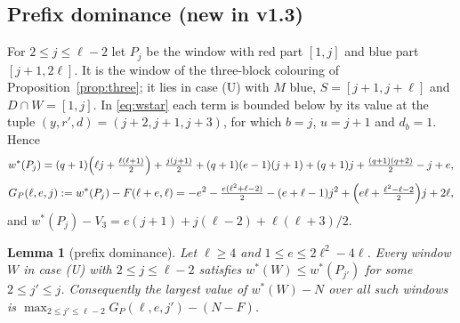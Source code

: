 \documentclass[11pt]{amsart}
\newtheorem{lemma}[theorem]{Lemma}
\theoremstyle{definition}
\newcommand{\F}{F}
\begin{document}
\subsection{Prefix dominance (new in v1.3)}\label{sec:prefix}

For $2\le j\le\ell-2$ let $P_j$ be the window with red part $[1,j]$ and blue part $[j+1,2\ell]$. It is the window of the three-block colouring of Proposition~\ref{prop:three}; it lies in case (U) with $M$ blue, $S=[j+1,j+\ell]$ and $D\cap W=[1,j]$. In \eqref{eq:wstar} each term is bounded below by its value at the tuple $(y,r',d)=(j+2,j+1,j+3)$, for which $b=j$, $u=j+1$ and $d_b=1$. Hence
\begin{equation}\label{eq:P0}
w^*(P_j)=(q+1)\Bigl(\ell j+\tfrac{\ell(\ell+1)}2\Bigr)+\tfrac{j(j+1)}2+(q+1)(e-1)(j+1)+(q+1)j+\tfrac{(q+1)(q+2)}2-j+e ,
\end{equation}
\begin{equation}\label{eq:GP}
G_P(\ell,e,j):=w^*(P_j)-\F(\ell+e,\ell)=-e^2-\tfrac{e(\ell^2+\ell-2)}2-(e+\ell-1)j^2+\Bigl(e\ell+\tfrac{\ell^2-\ell-2}2\Bigr)j+2\ell ,
\end{equation}
and $w^*(P_j)-V_3=e(j+1)+j(\ell-2)+\ell(\ell+3)/2$.

\begin{lemma}[prefix dominance]\label{lem:prefix}
Let $\ell\ge4$ and $1\le e\le2\ell^2-4\ell$. Every window $W$ in case (U) with $2\le j\le\ell-2$ satisfies $w^*(W)\le w^*(P_{j'})$ for some $2\le j'\le j$. Consequently the largest value of $w^*(W)-N$ over all such windows is $\max_{2\le j'\le\ell-2}G_P(\ell,e,j')-(N-\F)$.
\end{lemma}
\end{document}
